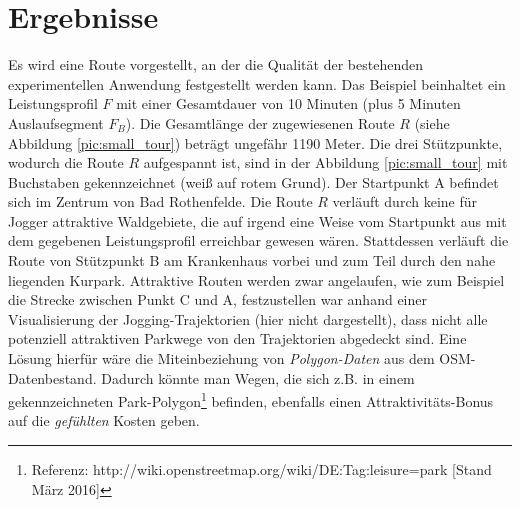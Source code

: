 \documentclass[12pt]{article}
\begin{document}
\section{Ergebnisse}\label{results}
Es wird eine Route vorgestellt, an der die Qualität der bestehenden experimentellen Anwendung festgestellt werden kann. Das Beispiel beinhaltet ein Leistungsprofil $F$ mit einer Gesamtdauer von 10 Minuten (plus 5 Minuten Auslaufsegment $F_B$). Die Gesamtlänge der zugewiesenen Route $R$ (siehe Abbildung \ref{pic:small_tour}) beträgt ungefähr 1190 Meter. Die drei Stützpunkte, wodurch die Route $R$ aufgespannt ist, sind in der Abbildung \ref{pic:small_tour} mit Buchstaben gekennzeichnet (weiß auf rotem Grund). Der Startpunkt A befindet sich im Zentrum von Bad Rothenfelde. Die Route $R$ verläuft durch keine für Jogger attraktive Waldgebiete, die auf irgend eine Weise vom Startpunkt aus mit dem gegebenen Leistungsprofil erreichbar gewesen wären. Stattdessen verläuft die Route von Stützpunkt B am Krankenhaus vorbei und zum Teil durch den nahe liegenden Kurpark. Attraktive Routen werden zwar angelaufen, wie zum Beispiel die Strecke zwischen Punkt C und A, festzustellen war anhand einer Visualisierung der Jogging-Trajektorien (hier nicht dargestellt), dass nicht alle potenziell attraktiven Parkwege von den Trajektorien abgedeckt sind. Eine Lösung hierfür wäre die Miteinbeziehung von \textit{Polygon-Daten} aus dem OSM-Datenbestand. Dadurch könnte man Wegen, die sich z.B. in einem gekennzeichneten Park-Polygon\footnote{Referenz: http://wiki.openstreetmap.org/wiki/DE:Tag:leisure=park [Stand März 2016]} befinden, ebenfalls einen Attraktivitäts-Bonus auf die \textit{gefühlten} Kosten geben. 
\end{document}
